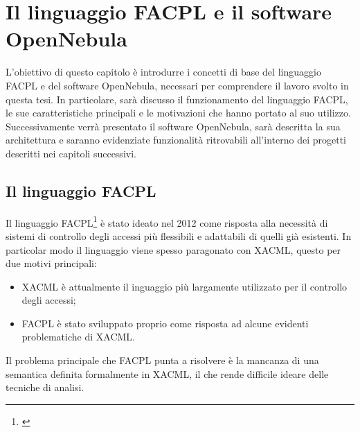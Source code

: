 \chapter{Il linguaggio FACPL e il software OpenNebula}
\label{cap:capitolo2}
L'obiettivo di questo capitolo è introdurre i concetti di base del linguaggio FACPL e del software OpenNebula, necessari per comprendere il lavoro svolto in questa tesi. In particolare, sarà discusso il funzionamento del linguaggio FACPL, le sue caratteristiche principali e le motivazioni che hanno portato al suo utilizzo. Successivamente verrà presentato il software OpenNebula, sarà descritta la sua architettura e saranno evidenziate funzionalità ritrovabili all'interno dei progetti descritti nei capitoli successivi.\par
\section{Il linguaggio FACPL}
Il linguaggio FACPL\footnote{\cite{FAPCLTesi}} è stato ideato nel 2012 come risposta alla necessità di sistemi di controllo degli accessi più flessibili e adattabili di quelli già esistenti. In particolar modo il linguaggio viene spesso paragonato con XACML, questo per due motivi principali: 
\begin{itemize}
    \item XACML è attualmente il inguaggio più largamente utilizzato per il controllo degli accessi;
    \item FACPL è stato sviluppato proprio come risposta ad alcune evidenti problematiche di XACML.
\end{itemize}
Il problema principale che FACPL punta a risolvere è la mancanza di una semantica definita formalmente in XACML, il che rende difficile ideare delle tecniche di analisi.
